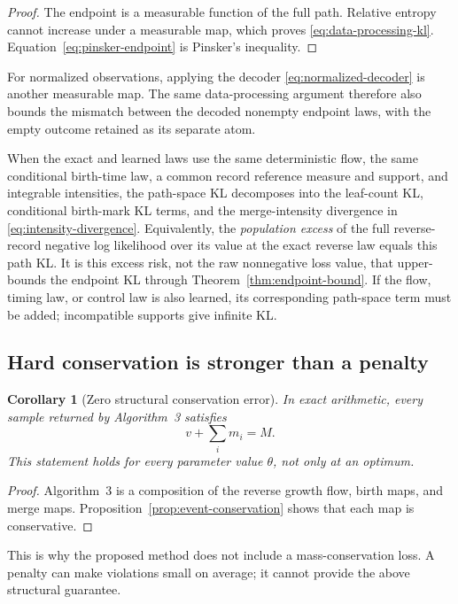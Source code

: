 \documentclass[10pt]{article}
\newtheorem{corollary}[theorem]{Corollary}
\theoremstyle{definition}
\theoremstyle{remark}
\begin{document}
\begin{proof}
The endpoint is a measurable function of the full path.  Relative entropy cannot increase under a measurable map, which proves \eqref{eq:data-processing-kl}.  Equation~\eqref{eq:pinsker-endpoint} is Pinsker's inequality.
\end{proof}

For normalized observations, applying the decoder
\eqref{eq:normalized-decoder} is another measurable map.  The same
data-processing argument therefore also bounds the mismatch between the
decoded nonempty endpoint laws, with the empty outcome retained as its
separate atom.

When the exact and learned laws use the same deterministic flow, the same
conditional birth-time law, a common record reference measure and support,
and integrable intensities, the path-space KL decomposes into the leaf-count
KL, conditional birth-mark KL terms, and the merge-intensity divergence in
\eqref{eq:intensity-divergence}.  Equivalently, the \emph{population excess}
of the full reverse-record negative log likelihood over its value at the
exact reverse law equals this path KL.  It is this excess risk, not the raw
nonnegative loss value, that upper-bounds the endpoint KL through
Theorem~\ref{thm:endpoint-bound}.  If the flow, timing law, or control law is
also learned, its corresponding path-space term must be added; incompatible
supports give infinite KL.

\subsection{Hard conservation is stronger than a penalty}

\begin{corollary}[Zero structural conservation error]
In exact arithmetic, every sample returned by Algorithm~3 satisfies
\begin{equation}
  v+\sum_i m_i=M.
\end{equation}
This statement holds for every parameter value $\theta$, not only at an optimum.
\end{corollary}

\begin{proof}
Algorithm~3 is a composition of the reverse growth flow, birth maps, and merge maps.  Proposition~\ref{prop:event-conservation} shows that each map is conservative.
\end{proof}

This is why the proposed method does not include a mass-conservation loss.  A penalty can make violations small on average; it cannot provide the above structural guarantee.
\end{document}
